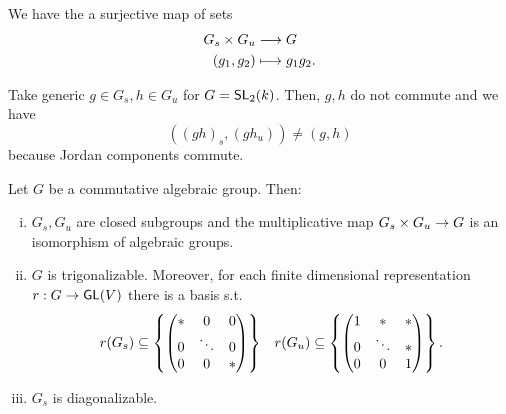 We have the a surjective map of sets
\begin{align*}
G_s \times G_u & \overset{}{\longrightarrow} G\\
(g_1, g_2) & \longmapsto g_1g_2.
\end{align*}
\begin{example}
Take generic $g \in G_s, h \in G_u$ for $G=\textsf{SL}_2(k)$. Then, $g,h$ do not commute and we have
\[ ((gh)_s, (gh_u)) \neq (g, h) \]
because Jordan components commute.
\end{example}
\begin{theorem}
Let $G$ be a commutative algebraic group. Then:
\begin{enumerate}[(i)]
	\item $G_s, G_u$ are closed subgroups and the multiplicative map $G_s \times G_u \overset{}{\rightarrow} G$ is an isomorphism of algebraic groups.
	\item $G$ is trigonalizable. Moreover, for each finite dimensional representation $r : G \overset{}{\rightarrow} \textsf{GL}(V)$ there is a basis s.t.
	\begin{align*}
	r(G_s) \subseteq \left\lbrace\left(\begin{matrix} * & 0& 0\\
	0 & \ddots & 0\\
0 & 0 & * \end{matrix}\right)\right\rbrace && 
	r(G_u) \subseteq \left\lbrace\left(\begin{matrix} 1 & * & *\\
		0 & \ddots & *\\
		0 & 0 & 1 \end{matrix}\right)\right\rbrace.
	\end{align*}
	\item $G_s$ is diagonalizable.
\end{enumerate}
\end{theorem}
